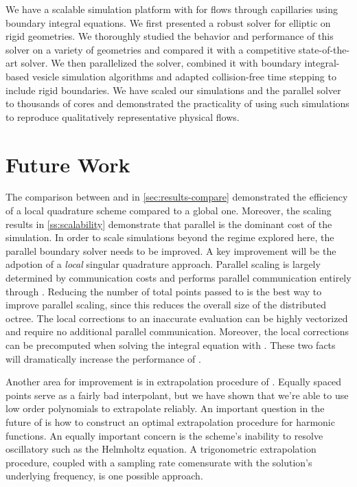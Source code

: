 
We have a scalable simulation platform with for \rbc flows through capillaries using boundary integral equations. 
We first presented a robust solver for elliptic \pdes on \threed rigid geometries. 
We thoroughly studied the behavior and performance of this solver on a variety of geometries and compared it with a competitive state-of-the-art solver.
We then parallelized the solver, combined it with boundary integral-based vesicle simulation algorithms and adapted collision-free time stepping to include rigid boundaries.
We have scaled our simulations and the parallel solver to thousands of cores and demonstrated the practicality of using such simulations to reproduce qualitatively representative physical \rbcs flows.

\section{Future Work}
The comparison between \qbkix and \cite{YBZ} in \cref{sec:results-compare} demonstrated the efficiency of a local quadrature scheme compared to a global one. 
Moreover, the scaling results in \cref{ss:scalability} demonstrate that parallel \qbkix is the dominant cost of the simulation.
In order to scale \rbc simulations beyond the regime explored here, the parallel boundary solver needs to be improved. 
A key improvement will be the adpotion of a \textit{local} singular quadrature approach.
Parallel scaling is largely determined by communication costs and \qbkix performs parallel communication entirely through \pvfmm. 
Reducing the number of total points passed to \pvfmm is the best way to improve parallel scaling, since this reduces the overall size of the distributed octree.
The local corrections to an inaccurate \fmm evaluation can be highly vectorized and require no additional parallel communication.
Moreover, the local corrections can be precomputed when solving the integral equation with \gmres. 
These two facts will dramatically increase the performance of \qbkix.

Another area for improvement is in extrapolation procedure of \qbkix. 
Equally spaced points serve as a fairly bad interpolant, but we have shown that we're able to use low order polynomials to extrapolate reliably.
An important question in the future of \qbkix is how to construct an optimal \oned extrapolation procedure for harmonic functions.
An equally important concern is the scheme's inability to resolve oscillatory \pdes such as the Helmholtz equation.
A trigonometric extrapolation procedure, coupled with a sampling rate comensurate with the solution's underlying frequency, is one possible approach.

